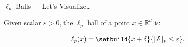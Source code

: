 \begin{frame}{$\ell_{p}$ Balls --- Let's Visualize\ldots}
  \begin{definition}
    Given scalar ${\varepsilon > 0}$, the $\ell_{p}$ ball of a point ${x \in \mathbb{R}^{d}}$ is:

    \begin{equation}\label{eq:LpBall}
      \ell_{p}(x) = \setbuild{x + \delta}{\norm{\delta}_{p} \leq \varepsilon}\text{.}
    \end{equation}
  \end{definition}

\end{frame}
